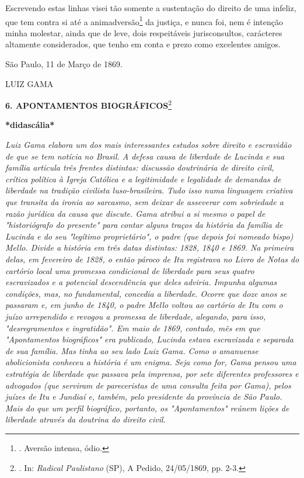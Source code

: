 Escrevendo estas linhas visei tão somente a sustentação do direito de
uma infeliz, que tem contra si até a animadversão\footnote{. Aversão
  intensa, ódio.} da justiça, e nunca foi, nem é intenção minha
molestar, ainda que de leve, dois respeitáveis jurisconsultos,
carácteres altamente considerados, que tenho em conta e prezo como
excelentes amigos.

São Paulo, 11 de Março de 1869.

LUIZ GAMA

\textbf{6. APONTAMENTOS BIOGRÁFICOS}\footnote{. In: \emph{Radical
  Paulistano} (SP), A Pedido, 24/05/1869, pp. 2-3.}

\textbf{*didascália*}

\emph{Luiz Gama elabora um dos mais interessantes estudos sobre direito
e escravidão de que se tem notícia no Brasil. A defesa causa de
liberdade de Lucinda e sua família articula três frentes distintas:
discussão doutrinária de direito civil, crítica política à Igreja
Católica e a legitimidade e legalidade de demandas de liberdade na
tradição civilista luso-brasileira. Tudo isso numa linguagem criativa
que transita da ironia ao sarcasmo, sem deixar de asseverar com
sobriedade a razão jurídica da causa que discute. Gama atribui a si
mesmo o papel de "historiógrafo do presente" para contar alguns traços
da história da família de Lucinda e do seu "legítimo proprietário", o
padre (que depois foi nomeado bispo) Mello. Divide a história em três
datas distintas: 1828, 1840 e 1869. Na primeira delas, em fevereiro de
1828, o então pároco de Itu registrava no Livro de Notas do cartório
local uma promessa condicional de liberdade para seus quatro
escravizados e a potencial descendência que deles adviria. Impunha
algumas condições, mas, no fundamental, concedia a liberdade. Ocorre que
doze anos se passaram e, em junho de 1840, o padre Mello voltou ao
cartório de Itu com o juízo arrependido e revogou a promessa de
liberdade, alegando, para isso, "desregramentos e ingratidão". Em maio
de 1869, contudo, mês em que "Apontamentos biográficos" era publicado,
Lucinda estava escravizada e separada de sua família. Mas tinha ao seu
lado Luiz Gama. Como o amanuense abolicionista conheceu a história é um
enigma. Seja como for, Gama pensou uma estratégia de liberdade que
passava pela imprensa, por sete diferentes professores e advogados (que
serviram de pareceristas de uma consulta feita por Gama), pelos juízes
de Itu e Jundiaí e, também, pelo presidente da província de São Paulo.
Mais do que um perfil biográfico, portanto, os "Apontamentos" reúnem
lições de liberdade através da doutrina do direito civil. }

